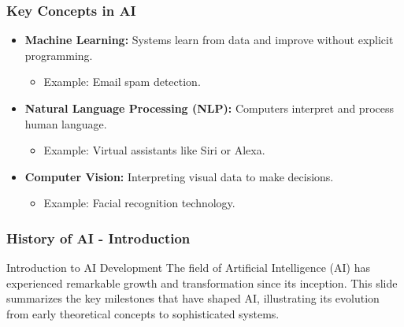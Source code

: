 \documentclass[aspectratio=169]{beamer}
\begin{document}
\begin{frame}[fragile]
    \frametitle{Key Concepts in AI}
    \begin{itemize}
        \item \textbf{Machine Learning:} Systems learn from data and improve without explicit programming.
        \begin{itemize}
            \item Example: Email spam detection.
        \end{itemize}
        \item \textbf{Natural Language Processing (NLP):} Computers interpret and process human language.
        \begin{itemize}
            \item Example: Virtual assistants like Siri or Alexa.
        \end{itemize}
        \item \textbf{Computer Vision:} Interpreting visual data to make decisions.
        \begin{itemize}
            \item Example: Facial recognition technology.
        \end{itemize}
    \end{itemize}
\end{frame}

\begin{frame}[fragile]
    \frametitle{History of AI - Introduction}
    \begin{block}{Introduction to AI Development}
        The field of Artificial Intelligence (AI) has experienced remarkable growth and transformation since its inception. This slide summarizes the key milestones that have shaped AI, illustrating its evolution from early theoretical concepts to sophisticated systems.
    \end{block}
\end{frame}
\end{document}
